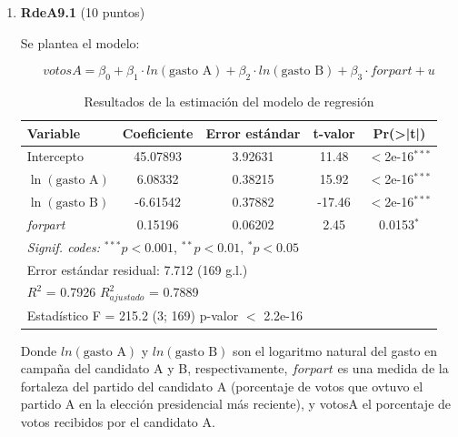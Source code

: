 \documentclass[10pt,a4paper]{article}
\begin{document}
\begin{enumerate}
\textbf{Conclusión:} Como bajo H1 el valor de $\beta_2$ es positivo solo es evidencia en contra de la nula la cola positiva. en este caso al tener $\beta_2$ un valor negativo el estadístico t de prueba también será negativo y no estará en la cola positiva.  Con los resultados disponibles, no se puede sostener que el efecto del \texttt{precio} sea mayor que cero al 1\%.
\color{black}

 
 \item \textbf{RdeA9.1} (10 puntos)  

Se plantea el modelo:

$$votosA = \beta_0 + \beta_1 \cdot ln(\text{gasto A}) + \beta_2 \cdot ln(\text{gasto B}) + \beta_3 \cdot forpart + u$$

\begin{table}[H]
\centering
\caption{Resultados de la estimación del modelo de regresión}
\label{tab:regresion}
\begin{tabular}{lcccc}
\toprule
\textbf{Variable} & \textbf{Coeficiente} & \textbf{Error estándar} & \textbf{t-valor} & \textbf{Pr(>|t|)} \\
\midrule
Intercepto & 45.07893 & 3.92631 & 11.48 & $<$2e-16$^{***}$ \\
$\ln(\text{gasto A})$ & 6.08332 & 0.38215 & 15.92 & $<$2e-16$^{***}$ \\
$\ln(\text{gasto B})$ & -6.61542 & 0.37882 & -17.46 & $<$2e-16$^{***}$ \\
\textit{forpart} & 0.15196 & 0.06202 & 2.45 & 0.0153$^{*}$ \\
\midrule
\multicolumn{5}{l}{\textit{Signif. codes:} $^{***}p<0.001$, $^{**}p<0.01$, $^{*}p<0.05$} \\
\midrule
\multicolumn{5}{l}{Error estándar residual: 7.712 (169 g.l.)} \\
\multicolumn{5}{l}{$R^2$ = 0.7926 \quad $R^2_{ajustado}$ = 0.7889} \\
\multicolumn{5}{l}{Estadístico F = 215.2 (3; 169) \quad p-valor $<$ 2.2e-16} \\
\bottomrule
\end{tabular}
\end{table}

Donde $ln(\text{gasto A})$ y $ln(\text{gasto B})$ son el logaritmo natural del gasto en campaña del candidato A y B, respectivamente, $forpart$ es una medida de la fortaleza del partido del candidato A (porcentaje de votos que ovtuvo el partido A en la elección presidencial más reciente), y votosA el porcentaje de votos recibidos por el candidato A.\\


\end{enumerate}
\end{document}
